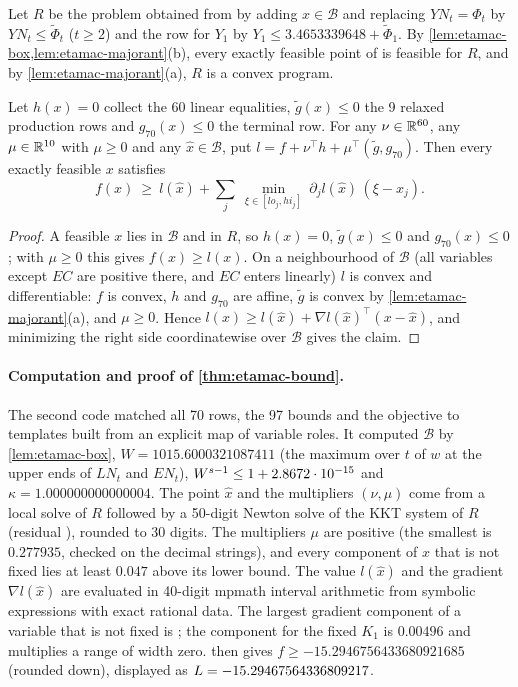 Let $R$ be the problem obtained from  by adding $x\in\mathcal B$ and replacing $Y\!N_t=\Phi_t$ by $Y\!N_t\le\tilde\Phi_t$ ($t\ge2$) and the row for $Y_1$ by $Y_1\le3.4653339648+\tilde\Phi_1$.
By \cref{lem:etamac-box,lem:etamac-majorant}(b), every exactly feasible point of  is feasible for $R$,
and by \cref{lem:etamac-majorant}(a), $R$ is a convex program.

\begin{proposition}\label{prop:etamac-tangent}
Let $h(x)=0$ collect the 60 linear equalities, $\tilde g(x)\le0$ the 9 relaxed production rows and $g_{70}(x)\le0$ the terminal row.
For any $\nu\in\mathbb{R}^{60}$, any $\mu\in\mathbb{R}^{10}$ with $\mu\ge0$ and any $\hat x\in\mathcal B$, put $l=f+\nu^\top h+\mu^\top(\tilde g,g_{70})$.
Then every exactly feasible $x$ satisfies
\[
f(x)\ \ge\ l(\hat x)+\sum_j\ \min_{\xi\in[lo_j,hi_j]}\ \partial_jl(\hat x)\,(\xi-\hat x_j).
\]
\end{proposition}

\begin{proof}
A feasible $x$ lies in $\mathcal B$ and in $R$, so $h(x)=0$, $\tilde g(x)\le0$ and $g_{70}(x)\le0$; with $\mu\ge0$ this gives $f(x)\ge l(x)$.
On a neighbourhood of $\mathcal B$ (all variables except $E\!C$ are positive there, and $E\!C$ enters linearly) $l$ is convex and differentiable:
$f$ is convex, $h$ and $g_{70}$ are affine, $\tilde g$ is convex by \cref{lem:etamac-majorant}(a), and $\mu\ge0$.
Hence $l(x)\ge l(\hat x)+\nabla l(\hat x)^\top(x-\hat x)$, and minimizing the right side coordinatewise over $\mathcal B$ gives the claim.
\end{proof}

\paragraph{Computation and proof of \cref{thm:etamac-bound}.}
The second code matched all 70 rows, the 97 bounds and the objective to templates built from an explicit map of variable roles.
It computed $\mathcal B$ by \cref{lem:etamac-box}, $W=1015.6000321087411$ (the maximum over $t$ of $w$ at the upper ends of $L\!N_t$ and $E\!N_t$),
$W^{s-1}\le1+2.8672\cdot 10^{-15}$ and $\kappa=1.000000000000004$.
The point $\hat x$ and the multipliers $(\nu,\mu)$ come from a local solve of $R$ followed by a 50-digit Newton solve of the KKT system of $R$ (residual ), rounded to 30 digits.
The multipliers $\mu$ are positive (the smallest is $0.277935$, checked on the decimal strings), and every component of $\hat x$ that is not fixed lies at least $0.047$ above its lower bound.
The value $l(\hat x)$ and the gradient $\nabla l(\hat x)$ are evaluated in 40-digit mpmath interval arithmetic from symbolic expressions with exact rational data.
The largest gradient component of a variable that is not fixed is ;
the component for the fixed $K_1$ is $0.00496$ and multiplies a range of width zero.
 then gives $f\ge-15.2946756433680921685$ (rounded down), displayed as $L=-15.29467564336809217$.

